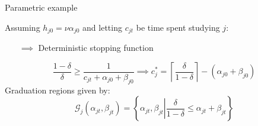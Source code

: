 \begin{frame}{Parametric example}\label{sim_parameterization}

Assuming $h_{j0} = \nu \alpha_{j0}$ and letting $c_{jt}$ be time spent studying $j$:
\begin{itemize}
    \item [$\implies$] Deterministic stopping function
\end{itemize}
\begin{equation*}
    \frac{1- \delta}{\delta} \geq \frac{1}{c_{jt} + \alpha_{j0} + \beta_{j0}} \implies 
    c_j^* = \left\lceil \frac{\delta}{1 - \delta} \right\rceil - (\alpha_{j0} + \beta_{j0})
\end{equation*}
Graduation regions given by:
\begin{equation*}
    \mathcal{G}_j (\alpha_{jt}, \beta_{jt}) = \left\{ 
        \alpha_{jt}, \beta_{jt} 
        \left\vert \frac{\delta}{1 - \delta} \leq \alpha_{jt} + \beta_{jt}
    \right.\right\}
\end{equation*}


\end{frame}
